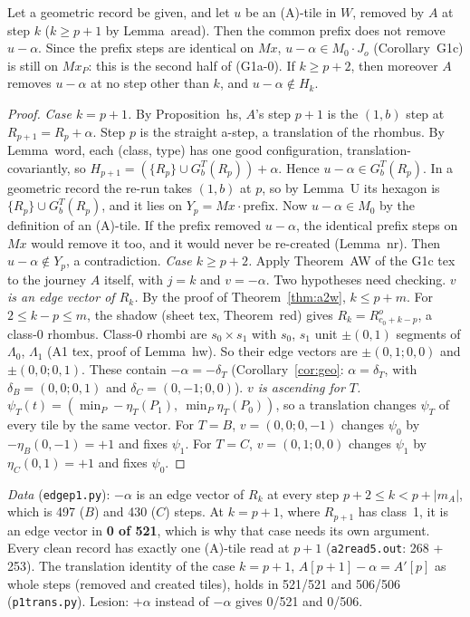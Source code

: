 \documentclass[11pt]{article}
\theoremstyle{definition}\newtheorem{definition}[theorem]{Definition}\newtheorem{remark}[theorem]{Remark}
\begin{document}
\begin{lemma}\label{lem:pref}
Let a geometric record be given, and let $u$ be an (A)-tile in $W$, removed by $A$ at step $k$ ($k\ge p+1$ by Lemma~aread). Then the common prefix does not remove $u-\alpha$. Since the prefix steps are identical on $Mx$, $u-\alpha\in M_0\cdot J_o$ (Corollary~G1c) is still on $Mx_P$: this is the second half of (G1a-0). If $k\ge p+2$, then moreover $A$ removes $u-\alpha$ at no step other than $k$, and $u-\alpha\notin H_k$.
\end{lemma}
\begin{proof}
\emph{Case $k=p+1$.} By Proposition~hs, $A$'s step $p+1$ is the $(1,b)$ step at $R_{p+1}=R_p+\alpha$. Step $p$ is the straight a-step, a translation of the rhombus. By Lemma~word, each (class, type) has one good configuration, translation-covariantly, so $H_{p+1}=(\{R_p\}\cup G^T_b(R_p))+\alpha$. Hence $u-\alpha\in G^T_b(R_p)$. In a geometric record the re-run takes $(1,b)$ at $p$, so by Lemma~U its hexagon is $\{R_p\}\cup G^T_b(R_p)$, and it lies on $Y_p=Mx\cdot\mathrm{prefix}$. Now $u-\alpha\in M_0$ by the definition of an (A)-tile. If the prefix removed $u-\alpha$, the identical prefix steps on $Mx$ would remove it too, and it would never be re-created (Lemma~nr). Then $u-\alpha\notin Y_p$, a contradiction.
\emph{Case $k\ge p+2$.} Apply Theorem~AW of the G1c tex to the journey $A$ itself, with $j=k$ and $v=-\alpha$. Two hypotheses need checking.
\emph{$v$ is an edge vector of $R_k$.} By the proof of Theorem~\ref{thm:a2w}, $k\le p+m$. For $2\le k-p\le m$, the shadow (sheet tex, Theorem~red) gives $R_k=R^o_{c_0+k-p}$, a class-0 rhombus. Class-0 rhombi are $s_0\times s_1$ with $s_0$, $s_1$ unit $\pm(0,1)$ segments of $\Lambda_0$, $\Lambda_1$ (A1 tex, proof of Lemma~hw). So their edge vectors are $\pm(0,1;0,0)$ and $\pm(0,0;0,1)$. These contain $-\alpha=-\delta_T$ (Corollary~\ref{cor:geo}: $\alpha=\delta_T$, with $\delta_B=(0,0;0,1)$ and $\delta_C=(0,-1;0,0)$).
\emph{$v$ is ascending for $T$.} $\psi_T(t)=(\min_P-\eta_T(P_1),\ \min_P\eta_T(P_0))$, so a translation changes $\psi_T$ of every tile by the same vector. For $T=B$, $v=(0,0;0,-1)$ changes $\psi_0$ by $-\eta_B(0,-1)=+1$ and fixes $\psi_1$. For $T=C$, $v=(0,1;0,0)$ changes $\psi_1$ by $\eta_C(0,1)=+1$ and fixes $\psi_0$.
\end{proof}
\noindent\emph{Data} (\texttt{edgep1.py}): $-\alpha$ is an edge vector of $R_k$ at every step $p+2\le k<p+|m_A|$, which is 497 ($B$) and 430 ($C$) steps. At $k=p+1$, where $R_{p+1}$ has class~1, it is an edge vector in \textbf{0 of 521}, which is why that case needs its own argument. Every clean record has exactly one (A)-tile read at $p+1$ (\texttt{a2read5.out}: 268 + 253). The translation identity of the case $k=p+1$, $A[p+1]-\alpha=A'[p]$ as whole steps (removed and created tiles), holds in 521/521 and 506/506 (\texttt{p1trans.py}). Lesion: $+\alpha$ instead of $-\alpha$ gives 0/521 and 0/506.
\end{document}
